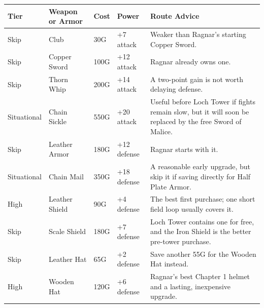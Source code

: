 \documentclass[
  american,
  10pt,
  letterpaper,
  oneside,
  open=any]{scrreprt}
\newcounter{none} %
\newenvironment{guidetable}{%
  \small\setstretch{1.0}%
  \setlength{\tabcolsep}{4pt}%
  \setlength{\LTpre}{8pt}\setlength{\LTpost}{10pt}%
  \renewcommand{\arraystretch}{1.16}%
}{ }
\begin{document}
\begin{guidetable}

{\def\LTcaptype{none} %
\begin{longtable}[]{@{}
  >{\raggedright\arraybackslash}p{}
  >{\raggedright\arraybackslash}p{}
  >{\raggedleft\arraybackslash}p{}
  >{\raggedleft\arraybackslash}p{}
  >{\raggedright\arraybackslash}p{}@{}}
\toprule\noalign{}
\begin{minipage}[b]{\linewidth}\raggedright
\color{GuideGreen}\bfseries Tier
\end{minipage} & \begin{minipage}[b]{\linewidth}\raggedright
\color{GuideGreen}\bfseries Weapon or Armor
\end{minipage} & \begin{minipage}[b]{\linewidth}\raggedleft
\color{GuideGreen}\bfseries Cost
\end{minipage} & \begin{minipage}[b]{\linewidth}\raggedleft
\color{GuideGreen}\bfseries Power
\end{minipage} & \begin{minipage}[b]{\linewidth}\raggedright
\color{GuideGreen}\bfseries Route Advice
\end{minipage} \\
\midrule\noalign{}
\endhead
\bottomrule\noalign{}
\endlastfoot
Skip & Club & 30G & +7 attack & Weaker than Ragnar's starting Copper
Sword. \\
Skip & Copper Sword & 100G & +12 attack & Ragnar already owns one. \\
Skip & Thorn Whip & 200G & +14 attack & A two-point gain is not worth
delaying defense. \\
Situational & Chain Sickle & 550G & +20 attack & Useful before Loch
Tower if fights remain slow, but it will soon be replaced by the free
Sword of Malice. \\
Skip & Leather Armor & 180G & +12 defense & Ragnar starts with it. \\
Situational & Chain Mail & 350G & +18 defense & A reasonable early
upgrade, but skip it if saving directly for Half Plate Armor. \\
High & Leather Shield & 90G & +4 defense & The best first purchase; one
short field loop usually covers it. \\
Skip & Scale Shield & 180G & +7 defense & Loch Tower contains one for
free, and the Iron Shield is the better pre-tower purchase. \\
Skip & Leather Hat & 65G & +2 defense & Save another 55G for the Wooden
Hat instead. \\
High & Wooden Hat & 120G & +6 defense & Ragnar's best Chapter 1 helmet
and a lasting, inexpensive upgrade. \\
\end{longtable}
}

\end{guidetable}
\end{document}
